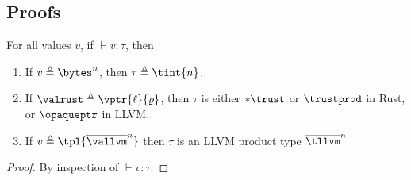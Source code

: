 \subsection{Proofs}
\label{appendix:types:proofs}
\begin{lemma}
\label{lemma:canonical}
For all values $v$, if $\vdash v:\tau$, then 
\begin{enumerate}
\item If $v\triangleq \bytes^n$, then $\tau \triangleq \tint{n}$.
\item If $\valrust \triangleq \vptr{\ell}{\varrho}$, then $\tau$ is either $*\trust$ or $\trustprod$ in Rust, or $\opaqueptr$ in LLVM.
\item If $v\triangleq \tpl{\overline{\vallvm}^n}$ then $\tau$ is an LLVM product type $\overline{\tllvm}^n$
\end{enumerate}
\begin{proof}
By inspection of $\vdash v:\tau$.
\end{proof}
\end{lemma}

